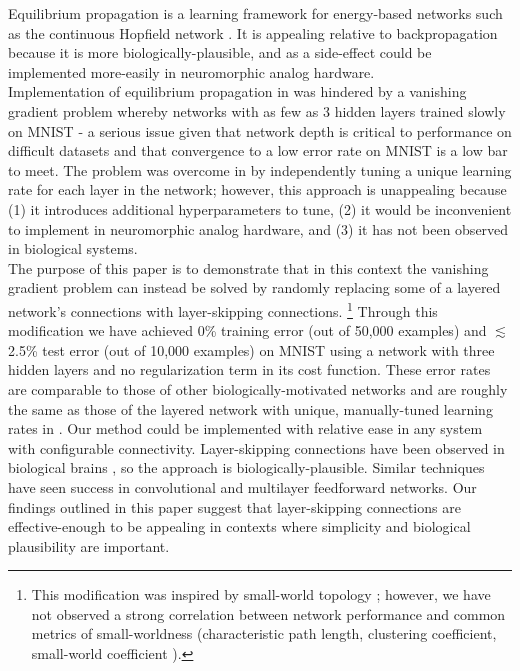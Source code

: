 \documentclass[format=sigconf]{acmart}
\newcommand{\npar}{\\\indent}
\begin{document}
Equilibrium propagation \cite{scellier17} is a learning framework for energy-based networks such as the continuous Hopfield network \cite{hopfield1984}. It is appealing relative to backpropagation because it is more biologically-plausible, and as a side-effect could be implemented more-easily in neuromorphic analog hardware.
\npar
Implementation of equilibrium propagation in \cite{scellier17} was hindered by a vanishing gradient problem whereby networks with as few as 3 hidden layers trained slowly on MNIST \cite{mnist1998} - a serious issue given that network depth is critical to performance on difficult datasets \cite{simonyan2014, srivastava2015tvdn} and that convergence to a low error rate on MNIST is a low bar to meet. The problem was overcome in \cite{scellier17} by independently tuning a unique learning rate for each layer in the network; however, this approach is unappealing because (1) it introduces additional hyperparameters to tune, (2) it would be inconvenient to implement in neuromorphic analog hardware, and (3) it has not been observed in biological systems.
\npar
The purpose of this paper is to demonstrate that in this context the vanishing gradient problem can instead be solved by randomly replacing some of a layered network's connections with layer-skipping connections.
\footnote{This modification was inspired by small-world topology \cite{watts98}; however, we have not observed a strong correlation between network performance and common metrics of small-worldness (characteristic path length, clustering coefficient, small-world coefficient ).}
Through this modification we have achieved 0\% training error (out of 50,000 examples) and $\lesssim$2.5\% test error (out of 10,000 examples) on MNIST using a network with three hidden layers and no regularization term in its cost function. These error rates are comparable to those of other biologically-motivated networks \cite{bartunov2018} and are roughly the same as those of the layered network with unique, manually-tuned learning rates in \cite{scellier17}. Our method could be implemented with relative ease in any system with configurable connectivity. Layer-skipping connections have been observed in biological brains \cite{bullmore2009}, so the approach is biologically-plausible. Similar techniques have seen success in convolutional \cite{he2015, srivastava2015} and multilayer feedforward \cite{xiaohu2011, krishnan2019} networks. Our findings outlined in this paper suggest that layer-skipping connections are effective-enough to be appealing in contexts where simplicity and biological plausibility are important.
\end{document}
